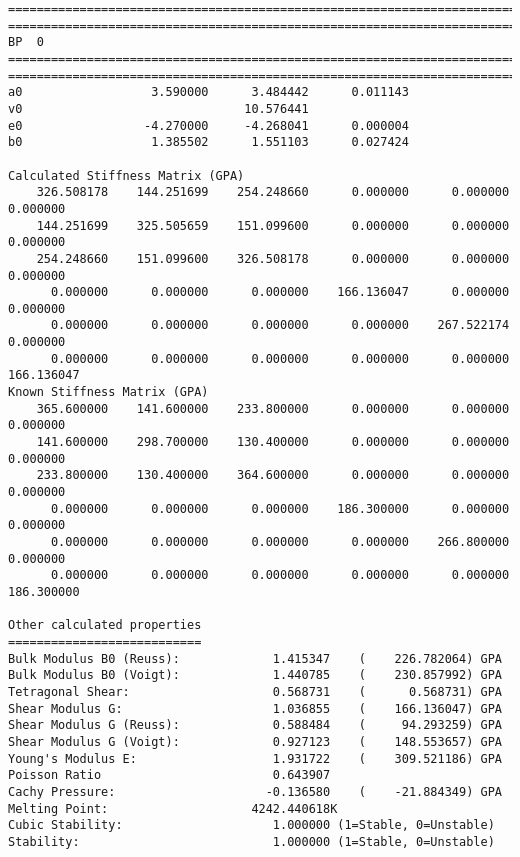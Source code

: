 \begin{lstlisting}[style=sPseudo,caption={Potential Properties}]
========================================================================================
========================================================================================
BP  0
========================================================================================
========================================================================================
a0                  3.590000      3.484442      0.011143
v0                               10.576441
e0                 -4.270000     -4.268041      0.000004
b0                  1.385502      1.551103      0.027424

Calculated Stiffness Matrix (GPA)
    326.508178    144.251699    254.248660      0.000000      0.000000      0.000000
    144.251699    325.505659    151.099600      0.000000      0.000000      0.000000
    254.248660    151.099600    326.508178      0.000000      0.000000      0.000000
      0.000000      0.000000      0.000000    166.136047      0.000000      0.000000
      0.000000      0.000000      0.000000      0.000000    267.522174      0.000000
      0.000000      0.000000      0.000000      0.000000      0.000000    166.136047
Known Stiffness Matrix (GPA)
    365.600000    141.600000    233.800000      0.000000      0.000000      0.000000
    141.600000    298.700000    130.400000      0.000000      0.000000      0.000000
    233.800000    130.400000    364.600000      0.000000      0.000000      0.000000
      0.000000      0.000000      0.000000    186.300000      0.000000      0.000000
      0.000000      0.000000      0.000000      0.000000    266.800000      0.000000
      0.000000      0.000000      0.000000      0.000000      0.000000    186.300000

Other calculated properties
===========================
Bulk Modulus B0 (Reuss):             1.415347    (    226.782064) GPA
Bulk Modulus B0 (Voigt):             1.440785    (    230.857992) GPA
Tetragonal Shear:                    0.568731    (      0.568731) GPA
Shear Modulus G:                     1.036855    (    166.136047) GPA
Shear Modulus G (Reuss):             0.588484    (     94.293259) GPA
Shear Modulus G (Voigt):             0.927123    (    148.553657) GPA
Young's Modulus E:                   1.931722    (    309.521186) GPA
Poisson Ratio                        0.643907
Cachy Pressure:                     -0.136580    (    -21.884349) GPA
Melting Point:                    4242.440618K
Cubic Stability:                     1.000000 (1=Stable, 0=Unstable)
Stability:                           1.000000 (1=Stable, 0=Unstable)
\end{lstlisting}




